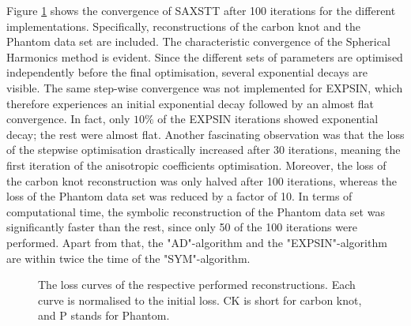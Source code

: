 Figure \ref{fig:Loss_curve_optimal} shows the convergence of SAXSTT after 100 iterations for the different implementations.
Specifically, reconstructions of the carbon knot and the Phantom data set are included.
The characteristic convergence of the Spherical Harmonics method is evident.
Since the different sets of parameters are optimised independently before the final optimisation, several exponential decays are visible.
The same step-wise convergence was not implemented for EXPSIN, which therefore experiences an initial exponential decay followed by an almost flat convergence.
In fact, only $10\%$ of the EXPSIN iterations showed exponential decay; the rest were almost flat.
Another fascinating observation was that the loss of the stepwise optimisation drastically increased after 30 iterations, meaning the first iteration of the anisotropic coefficients optimisation.
Moreover, the loss of the carbon knot reconstruction was only halved after 100 iterations, whereas the loss of the Phantom data set was reduced by a factor of 10.
In terms of computational time, the symbolic reconstruction of the Phantom data set was significantly faster than the rest, since only 50 of the 100 iterations were performed.
Apart from that, the "AD"-algorithm and the "EXPSIN"-algorithm are within twice the time of the "SYM"-algorithm.



\begin{figure}[h!]
    \centering
    \caption{ The loss curves of the respective performed reconstructions. Each curve is normalised to the initial loss.
        CK is short for carbon knot, and P stands for Phantom. }
    \label{fig:Loss_curve_optimal}
\end{figure}